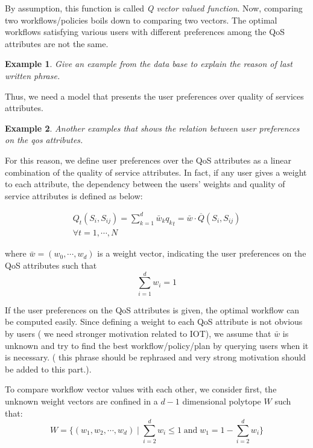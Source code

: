 \documentclass[10pt,journal,compsoc]{IEEEtran}
\newtheorem{example}{Example}
\begin{document}
By assumption, this function is called \emph{Q vector valued function}. Now, comparing two workflows/policies boils down to comparing two vectors. The optimal workflows satisfying various users with different preferences among the QoS attributes are not the same. 

\begin{example}
Give an example from the data base to explain the reason of last written phrase.
\end{example}

Thus, we need a model that presents the user preferences over quality of services attributes. 
\begin{example}
Another examples that shows the relation between user preferences on the qos attributes.
\end{example}

For this reason, we define user preferences over the QoS attributes as a linear combination of the quality of service attributes. In fact, if any user gives a  weight to each attribute, the dependency between the users' weights and quality of service attributes is defined as below:

\begin{multline}
Q_t(S_i, S_{ij}) = \sum_{k=1}^d \bar{w}_k {q_k}_t = \bar{w} \cdot \overline{Q}(S_i, S_{ij}) \\
\forall t = 1, \cdots, N
\end{multline}

where $\bar{w} = (w_0, \cdots, w_d) $ is a weight vector, indicating the user preferences on the QoS attributes such that 
\begin{equation*}
\sum_{i=1}^d w_i = 1
\end{equation*}

If the user preferences on the QoS attributes is given, the optimal workflow can be computed easily. Since defining a weight to each QoS attribute is not obvious by users ({\color{red} we need stronger motivation related to IOT}), we assume that $\bar{w}$ is unknown and try to find the best workflow/policy/plan by querying users when it is necessary. ({\color{red} this phrase should be rephrased and very strong motivation should be added to this part.}). 

To compare workflow vector values with each other, we consider first, the unknown weight vectors are confined in a $d-1$ dimensional polytope $W$ such that:
\begin{equation}
W = \{ (w_1, w_2, \cdots, w_d) \; | \; \sum_{i=2}^d w_i \leq 1 \; \text{and} \; w_1 = 1-\sum_{i=2}^d w_i \}
\end{equation}
\end{document}
